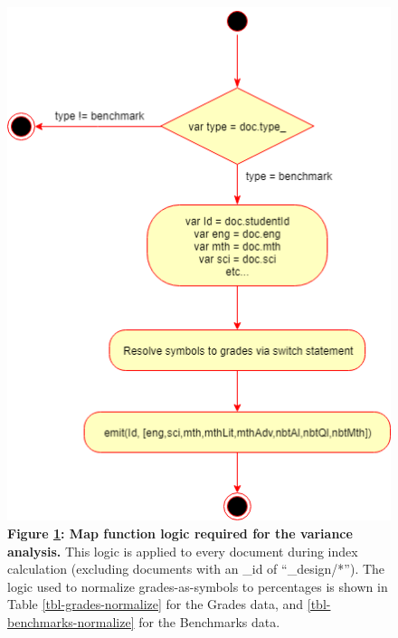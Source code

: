 \begin{figure}[H]
    \centering
    \begin{mdframed}
        \centering
        \includegraphics[scale=0.35]{./resources/figures/variance-map.png}
    \end{mdframed}
    \caption[Variance Map Function]{\textbf{Figure \ref{fig-variance-map-function}: Map function logic required for the variance analysis.} This logic is applied to every document during index calculation (excluding documents with an \_id of ``\_design/*''). The logic used to normalize grades-as-symbols to percentages is shown in Table \ref{tbl-grades-normalize} for the Grades data, and \ref{tbl-benchmarks-normalize} for the Benchmarks data.}
    \label{fig-variance-map-function}
\end{figure}
